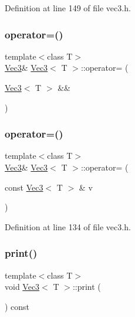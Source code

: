 Definition at line 149 of file vec3.\+h.

\mbox{\label{class_vec3_a09d0d4c326c3a4c10a0917f6071382bb}} 
\subsubsection{\texorpdfstring{operator=()}{operator=()}\hspace{0.1cm}{\footnotesize\ttfamily [1/2]}}
{\footnotesize\ttfamily template$<$class T$>$ \\
\mbox{\hyperlink{class_vec3}{Vec3}}\& \mbox{\hyperlink{class_vec3}{Vec3}}$<$ T $>$\+::operator= (\begin{DoxyParamCaption}\item[{\mbox{\hyperlink{class_vec3}{Vec3}}$<$ T $>$ \&\&}]{ }\end{DoxyParamCaption})\hspace{0.3cm}{\ttfamily [default]}}

\mbox{\label{class_vec3_a4ffd4490e1f59f88447f92083e6e7072}} 
\subsubsection{\texorpdfstring{operator=()}{operator=()}\hspace{0.1cm}{\footnotesize\ttfamily [2/2]}}
{\footnotesize\ttfamily template$<$class T$>$ \\
\mbox{\hyperlink{class_vec3}{Vec3}}\& \mbox{\hyperlink{class_vec3}{Vec3}}$<$ T $>$\+::operator= (\begin{DoxyParamCaption}\item[{const \mbox{\hyperlink{class_vec3}{Vec3}}$<$ T $>$ \&}]{v }\end{DoxyParamCaption})\hspace{0.3cm}{\ttfamily [inline]}}



Definition at line 134 of file vec3.\+h.

\mbox{\label{class_vec3_af10c9e364bdec9abd60045bf3d523293}} 
\subsubsection{\texorpdfstring{print()}{print()}}
{\footnotesize\ttfamily template$<$class T$>$ \\
void \mbox{\hyperlink{class_vec3}{Vec3}}$<$ T $>$\+::print (\begin{DoxyParamCaption}{ }\end{DoxyParamCaption}) const\hspace{0.3cm}{\ttfamily [inline]}}



